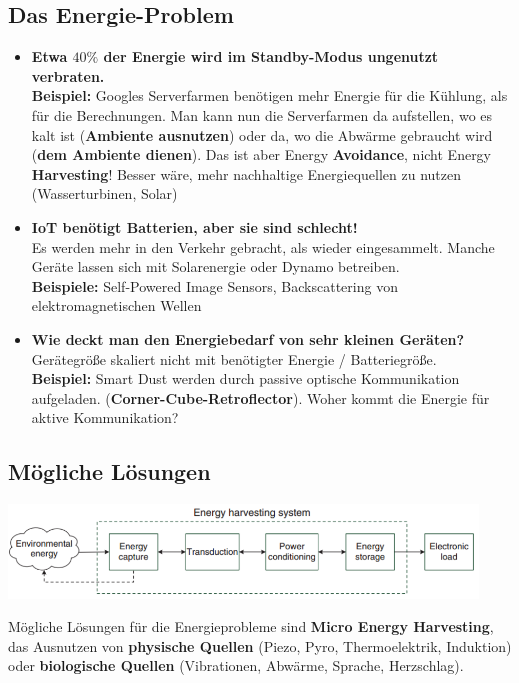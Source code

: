 \documentclass[a4paper]{article}
\begin{document}
\subsection{Das Energie-Problem}
\begin{itemize}
	\item \textbf{Etwa $40\%$ der Energie wird im Standby-Modus ungenutzt verbraten.}\\
	\textbf{Beispiel:} Googles Serverfarmen benötigen mehr Energie für die Kühlung, als für die Berechnungen. Man kann nun die Serverfarmen da aufstellen, wo es kalt ist (\textbf{Ambiente ausnutzen}) oder da, wo die Abwärme gebraucht wird (\textbf{dem Ambiente dienen}). Das ist aber Energy \textbf{Avoidance}, nicht Energy \textbf{Harvesting}! Besser wäre, mehr nachhaltige Energiequellen zu nutzen (Wasserturbinen, Solar)\newpage
	\item \textbf{IoT benötigt Batterien, aber sie sind schlecht!}\\ Es werden mehr in den Verkehr gebracht, als wieder eingesammelt. Manche Geräte lassen sich mit Solarenergie oder Dynamo betreiben. \\
	\textbf{Beispiele:} Self-Powered Image Sensors, Backscattering von elektromagnetischen Wellen
	\item \textbf{Wie deckt man den Energiebedarf von sehr kleinen Geräten?}\\
	Gerätegröße skaliert nicht mit benötigter Energie / Batteriegröße.\\
	\textbf{Beispiel:} Smart Dust werden durch passive optische Kommunikation aufgeladen. (\textbf{Corner-Cube-Retroflector}). Woher kommt die Energie für aktive Kommunikation?
\end{itemize}
\subsection{Mögliche Lösungen}
\begin{center}
	\includegraphics[height = 2.5cm]{Harvesting.png}
\end{center}

Mögliche Lösungen für die Energieprobleme sind \textbf{Micro Energy Harvesting}, das Ausnutzen von \textbf{physische Quellen} (Piezo, Pyro, Thermoelektrik, Induktion) oder \textbf{biologische Quellen} (Vibrationen, Abwärme, Sprache, Herzschlag).
\end{document}

